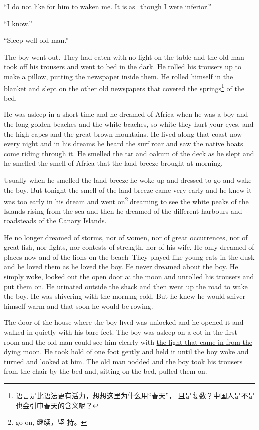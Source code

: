 \documentclass[fontset=ubuntu,zihao=-4]{ctexrep}
\begin{document}
``I do not like \uline{for him to waken me}. It is \gls{as_though} I were \gls{inferior}.''

``I know.''

``Sleep well old man.''

The boy went out. They had eaten with no light on the table and the old man
took off his trousers and went to bed in the dark. He \gls{rolled} his
trousers up to make a \gls{pillow}, putting the newspaper inside them. He
rolled himself in the blanket and slept on the other old newspapers that
covered the springs\footnote{语言是比语法更有活力，想想这里为什么用“春天”，
  且是复数？中国人是不是也会引申春天的含义呢？} of the bed.

He was asleep in a short time and he dreamed of \gls{Africa} when he was a
boy and the long golden beaches and the white beaches, so white they hurt
your eyes, and the high capes and the great brown mountains. He lived along
that coast now every night and in his dreams he heard the \gls{surf}
\gls{roar} and saw the \gls{native} boats come riding through it. He smelled
the \gls{tar} and \gls{oakum} of the \gls{deck} as he slept and he smelled
the smell of Africa that the land breeze brought at morning.

Usually when he smelled the land breeze he woke up and dressed to go and
wake the boy. But tonight the smell of the land breeze came very early and
he knew it was too early in his dream and went on\footnote{go on, 继续，坚
  持。} dreaming to see the white peaks of the Islands rising from the sea
and then he dreamed of the different harbours and roadsteads of the Canary
Islands.

He no longer dreamed of storms, nor of women, nor of great \glspl{occurrence}, nor
of great fish, nor fights, nor contests of \gls{strength}, nor of his wife. He
only dreamed of places now and of the lions on the beach. They played like
young cats in the dusk and he loved them as he loved the boy. He never
dreamed about the boy. He simply woke, looked out the open door at the moon
and unrolled his trousers and put them on. He \gls{urinated} outside the shack and
then went up the road to wake the boy. He was shivering with the morning
cold. But he knew he would shiver himself warm and that soon he would be
rowing.

The door of the house where the boy lived was unlocked and he opened it and
walked in quietly with his \gls{bare} \gls{feet}. The boy was asleep on a
\gls{cot} in the first room and the old man could see him clearly with
\uline{the light that came in from the dying moon}. He took hold of one foot
\gls{gently} and held it until the boy woke and turned and looked at him.
The old man \gls{nodded} and the boy took his trousers from the chair by the
bed and, sitting on the bed, pulled them on.
\end{document}
